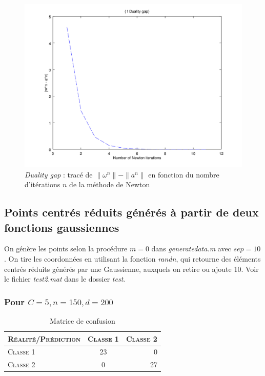 \documentclass{article}
\begin{document}
         \begin{figure}
           \begin{center}
             \includegraphics[scale=0.5]{images/duality1.png}
             \caption{\emph{Duality gap} : tracé de $\|\omega^n\| - \|a^n\|$ en fonction du nombre d'itérations $n$ de la méthode de Newton}
           \end{center}
         \end{figure}

\subsection{Points centrés réduits générés à partir de deux fonctions gaussiennes}

On génère les points selon la procédure $m = 0$ dans \emph{generatedata.m} avec $sep=10$. On tire les coordonnées en utilisant la fonction \emph{randn}, qui retourne des éléments centrés réduits générés par une Gaussienne, auxquels on retire ou ajoute 10. Voir le fichier \emph{test2.mat} dans le dossier \emph{test}. 

\subsubsection{Pour $C=5, n=150, d=200$}

     \begin{table}[H]
       \caption{Matrice de confusion}
       \begin{tabular}{|l|c|r|}
         \hline
         \textsc{Réalité/Prédiction} & \textsc{Classe 1} & \textsc{Classe 2}\\
         \hline
         \textsc{Classe 1} & 23 & 0\\
         \hline
         \textsc{Classe 2} & 0 & 27\\
         \hline
       \end{tabular}
     \end{table}
\end{document}
